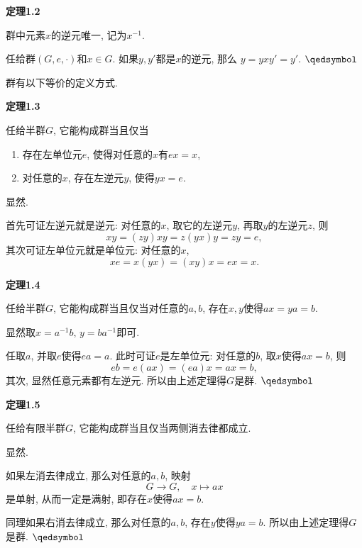 \documentclass[UTF8]{ctexart}
\begin{document}
\vspace{10pt}

\hypertarget{sec:定理1.2}{}
\noindent\textbf{定理1.2}

群中元素$x$的逆元唯一, 记为$x^{-1}$.


任给群$(G,e,\cdot)$和$x\in G$. 如果$y,y'$都是$x$的逆元, 那么
$y=yxy'=y'$. \hfill $\qedsymbol$





\newpage

群有以下等价的定义方式.

\vspace{10pt}

\hypertarget{sec:定理1.3}{}
\noindent\textbf{定理1.3}

任给半群$G$, 它能构成群当且仅当
\begin{enumerate}
    \item 存在左单位元$e$, 使得对任意的$x$有$ex=x$,
    \item 对任意的$x$, 存在左逆元$y$, 使得$yx=e$.
\end{enumerate}


 显然.


首先可证左逆元就是逆元: 对任意的$x$, 取它的左逆元$y$, 再取$y$的左逆元$z$, 则
\[
    xy=(zy)xy=z(yx)y=zy=e,
\]
其次可证左单位元就是单位元: 对任意的$x$,
\begin{equation*}
    xe=x(yx)=(xy)x=ex=x.
\tag*{\qedsymbol}\end{equation*}

\vspace{10pt}

\hypertarget{sec:定理1.4}{}
\noindent\textbf{定理1.4}

任给半群$G$, 它能构成群当且仅当对任意的$a,b$, 存在$x,y$使得$ax=ya=b$.


 显然取$x=a^{-1}b,\,y=ba^{-1}$即可.


任取$a$, 并取$e$使得$ea=a$. 此时可证$e$是左单位元: 对任意的$b$, 取$x$使得$ax=b$, 则
\[
    eb=e(ax)=(ea)x=ax=b,
\]
其次, 显然任意元素都有左逆元. 所以由上述定理得$G$是群. \hfill $\qedsymbol$

\vspace{10pt}

\hypertarget{sec:定理1.5}{}
\noindent\textbf{定理1.5}

任给有限半群$G$, 它能构成群当且仅当两侧消去律都成立.


 显然.


如果左消去律成立, 那么对任意的$a,b$, 映射
\[
    G\to G,\quad x\mapsto ax
\]
是单射, 从而一定是满射, 即存在$x$使得$ax=b$.

同理如果右消去律成立, 那么对任意的$a,b$, 存在$y$使得$ya=b$.
所以由上述定理得$G$是群. \hfill $\qedsymbol$
\end{document}
